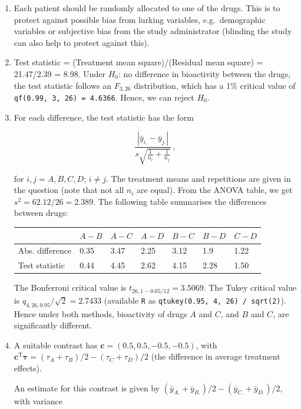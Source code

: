 \documentclass[
]{book}
\theoremstyle{definition}
\theoremstyle{definition}
\theoremstyle{definition}
\theoremstyle{definition}
\theoremstyle{remark}
\begin{document}
\begin{enumerate}
\def\labelenumi{\roman{enumi}.}
\item
  Each patient should be randomly allocated to one of the drugs. This is to protect against possible bias from lurking variables, e.g.~demographic variables or subjective bias from the study administrator (blinding the study can also help to protect against this).
\item
  Test statistic = (Treatment mean square)/(Residual mean square) = 21.47/2.39 = 8.98. Under \(H_0\): no difference in bioactivity between the drugs, the test statistic follows an \(F_{3,26}\) distribution, which has a 1\% critical value of \texttt{qf(0.99,\ 3,\ 26)\ =\ 4.6366}. Hence, we can reject \(H_0\).
\item
  For each difference, the test statistic has the form

  \[
   \frac{|\bar{y}_{i.}-\bar{y}_{j.}|}{s\sqrt{\frac{1}{n_i}+\frac{1}{n_j}}}\,,
   \]

  for \(i, j = A, B, C, D;\, i\ne j\). The treatment means and repetitions are given in the question (note that not all \(n_i\) are equal). From the ANOVA table, we get \(s^2 = 62.12/26 = 2.389\). The following table summarises the differences between drugs:

  \begin{longtable}[]{@{}lllllll@{}}
  \toprule
  & \(A-B\) & \(A-C\) & \(A-D\) & \(B-C\) & \(B-D\) & \(C-D\) \\
  \midrule
  \endhead
  Abs. difference & 0.35 & 3.47 & 2.25 & 3.12 & 1.9 & 1.22 \\
  Test statistic & 0.44 & 4.45 & 2.62 & 4.15 & 2.28 & 1.50 \\
  \bottomrule
  \end{longtable}

  The Bonferroni critical value is \(t_{26, 1-0.05/12} = 3.5069\). The Tukey critical value is \(q_{4,26, 0.95}/\sqrt{2} = 2.7433\) (available \texttt{R} as \texttt{qtukey(0.95,\ 4,\ 26)\ /\ sqrt(2)}). Hence under both methods, bioactivity of drugs \(A\) and \(C\), and \(B\) and \(C\), are significantly different.
\item
  A suitable contrast has \(\boldsymbol{c} = (0.5, 0.5, -0.5, -0.5)\), with \(\boldsymbol{c}^{\mathrm{T}}\boldsymbol{\tau} = (\tau_A + \tau_B) / 2 - (\tau_C + \tau_D) / 2\) (the difference in average treatment effects).

  An estimate for this contrast is given by \((\bar{y}_{A.} + \bar{y}_{B.}) / 2 - (\bar{y}_{C.} + \bar{y}_{D.}) / 2\), with variance


\end{enumerate}
\end{document}
